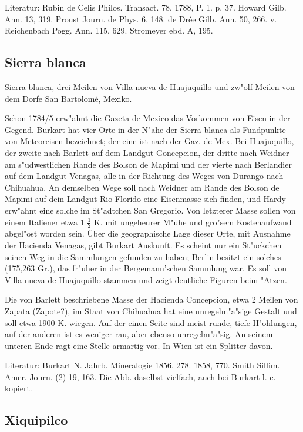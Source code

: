 \documentclass[a4paper, 11pt, oneside]{article}
\begin{document}
Literatur: Rubin de Celis Philos. Transact. 78, 1788, P. 1. p. 37. Howard Gilb. Ann. 13, 319. Proust Journ. de Phys. 6, 148. de Drée Gilb. Ann. 50, 266. v. Reichenbach Pogg. Ann. 115, 629. Stromeyer ebd. A, 195.

\subsection{Sierra blanca}

Sierra blanca, drei Meilen von Villa nueva de Huajuquillo und zw"olf Meilen von dem Dorfe San Bartolomé, Mexiko.

Schon 1784/5 erw"ahnt die Gazeta de Mexico das Vorkommen von Eisen in der Gegend. Burkart hat vier Orte in der N"ahe der Sierra blanca als Fundpunkte von Meteoreisen bezeichnet; der eine ist nach der Gaz. de Mex. Bei Huajuquillo, der zweite nach Barlett auf dem Landgut Goncepcion, der dritte nach Weidner am s"udwestlichen Rande des Bolson de Mapimi und der vierte nach Berlandier auf dem Landgut Venagas, alle in der Richtung des Weges von Durango nach Chihuahua. An demselben Wege soll nach Weidner am Rande des Bolson de Mapimi auf dein Landgut Rio Florido eine Eisenmasse sich finden, und Hardy erw"ahnt eine solche im St"adtchen San Gregorio. Von letzterer Masse sollen von einem Italiener etwa 1 $\frac{1}{2}$ K. mit ungeheurer M"uhe und gro"sem Kostenaufwand abgel"ost worden sein. Über die geographische Lage dieser Orte, mit Ausnahme der Hacienda Venagas, gibt Burkart Auskunft. Es scheint nur ein St"uckchen seinen Weg in die Sammlungen gefunden zu haben; Berlin besitzt ein solches (175,263 Gr.), das fr"uher in der Bergemann'schen Sammlung war. Es soll von Villa nueva de Huajuquillo stammen und zeigt deutliche Figuren beim "Atzen.

Die von Barlett beschriebene Masse der Hacienda Concepcion, etwa 2 Meilen von Zapata (Zapote?), im Staat von Chihuahua hat eine unregelm"a"sige Gestalt und soll etwa 1900 K. wiegen. Auf der einen Seite sind meist runde, tiefe H"ohlungen, auf der anderen ist es weniger rau, aber ebenso unregelm"a"sig. An seinem unteren Ende ragt eine Stelle armartig vor. In Wien ist ein Splitter davon.

Literatur: Burkart N. Jahrb. Mineralogie 1856, 278. 1858, 770. Smith Sillim. Amer. Journ. (2) 19, 163. Die Abb. daselbst vielfach, auch bei Burkart l. c. kopiert.

\subsection{Xiquipilco}
\end{document}
